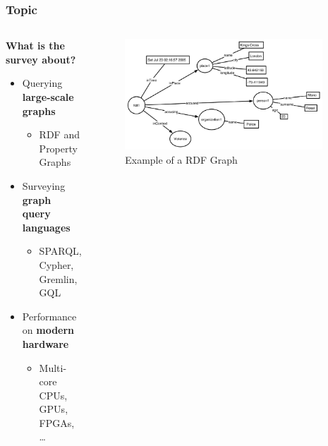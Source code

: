 \documentclass[
	aspectratio=169,
	compress,
]{beamer}
\newcommand{\navframetitle}[1]{\frametitle{#1\hfill{\footnotesize\lastsection{}}}}
\begin{document}
\begin{frame}
	\navframetitle{Topic}

	\begin{columns}[T]
		\begin{column}{0.5\textwidth}
	\textbf{What is the survey about?}
	\begin{itemize}
		\item Querying \textbf{large-scale graphs} 
        \begin{itemize}
            \item RDF and Property Graphs
        \end{itemize}
		\item Surveying \textbf{graph query languages}
        \begin{itemize}
            \item SPARQL, Cypher, Gremlin, GQL
        \end{itemize}
		\item Performance on \textbf{modern hardware}
            \begin{itemize}
                \item Multi-core CPUs, GPUs, FPGAs, \dots
            \end{itemize}
	\end{itemize}
        \end{column}
		\begin{column}{0.5\textwidth}
            \begin{figure}
                \centering
                \includegraphics[width=0.95\textwidth]{./figures/rdf_graph.png}
                \captionsetup{justification=centering}
                \caption{Example of a RDF Graph \cite{VincenzoSemanticReasoner}}
                \label{fig:rdfGraph}
            \end{figure}
        \end{column}
	\end{columns}

\end{frame}
\end{document}
